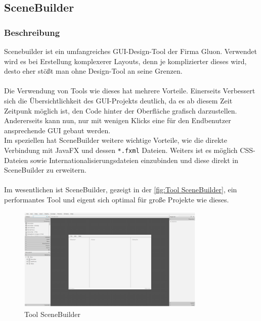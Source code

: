 \subsection{SceneBuilder}\label{subsec:scenebuilder}
\subsubsection{Beschreibung}
Scenebuilder ist ein umfangreiches GUI-Design-Tool der Firma Gluon.
Verwendet wird es bei Erstellung komplexerer Layouts, denn je komplizierter dieses wird, desto eher stößt man ohne Design-Tool an seine Grenzen.\\\\
Die Verwendung von Tools wie dieses hat mehrere Vorteile.
Einerseits Verbessert sich die Übersichtlichkeit des GUI-Projekts deutlich, da es ab diesem Zeit Zeitpunk möglich ist, den Code hinter der Oberfläche grafisch darzustellen.
Andererseits kann nun, nur mit wenigen Klicks eine für den Endbenutzer ansprechende GUI gebaut werden.\\
Im speziellen hat SceneBuilder weitere wichtige Vorteile, wie die direkte Verbindung mit JavaFX und dessen \lstinline{*.fxml} Dateien.
Weiters ist es möglich CSS-Dateien sowie Internationalisierungsdateien einzubinden und diese direkt in SceneBuilder zu erweitern.\\\\
Im wesentlichen ist SceneBuilder, gezeigt in der \autoref{fig:Tool SceneBuilder}, ein performantes Tool und eigent sich optimal für große Projekte wie dieses.
\begin{figure}[H]
    \centering
    \includegraphics[width=0.8\textwidth]{fig/ainf/SceneBuilder.png}
    \caption{Tool SceneBuilder}
    \label{fig:Tool SceneBuilder}
\end{figure}
